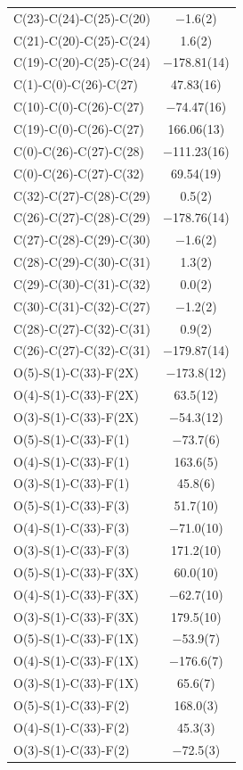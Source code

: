 \begin{center}
{\begin{supertabular}{p{1.5in}c}
C(23)-C(24)-C(25)-C(20)&$-$1.6(2)\\
C(21)-C(20)-C(25)-C(24)&1.6(2)\\
C(19)-C(20)-C(25)-C(24)&$-$178.81(14)\\
C(1)-C(0)-C(26)-C(27)&47.83(16)\\
C(10)-C(0)-C(26)-C(27)&$-$74.47(16)\\
C(19)-C(0)-C(26)-C(27)&166.06(13)\\
C(0)-C(26)-C(27)-C(28)&$-$111.23(16)\\
C(0)-C(26)-C(27)-C(32)&69.54(19)\\
C(32)-C(27)-C(28)-C(29)&0.5(2)\\
C(26)-C(27)-C(28)-C(29)&$-$178.76(14)\\
C(27)-C(28)-C(29)-C(30)&$-$1.6(2)\\
C(28)-C(29)-C(30)-C(31)&1.3(2)\\
C(29)-C(30)-C(31)-C(32)&0.0(2)\\
C(30)-C(31)-C(32)-C(27)&$-$1.2(2)\\
C(28)-C(27)-C(32)-C(31)&0.9(2)\\
C(26)-C(27)-C(32)-C(31)&$-$179.87(14)\\
O(5)-S(1)-C(33)-F(2X)&$-$173.8(12)\\
O(4)-S(1)-C(33)-F(2X)&63.5(12)\\
O(3)-S(1)-C(33)-F(2X)&$-$54.3(12)\\
O(5)-S(1)-C(33)-F(1)&$-$73.7(6)\\
O(4)-S(1)-C(33)-F(1)&163.6(5)\\
O(3)-S(1)-C(33)-F(1)&45.8(6)\\
O(5)-S(1)-C(33)-F(3)&51.7(10)\\
O(4)-S(1)-C(33)-F(3)&$-$71.0(10)\\
O(3)-S(1)-C(33)-F(3)&171.2(10)\\
O(5)-S(1)-C(33)-F(3X)&60.0(10)\\
O(4)-S(1)-C(33)-F(3X)&$-$62.7(10)\\
O(3)-S(1)-C(33)-F(3X)&179.5(10)\\
O(5)-S(1)-C(33)-F(1X)&$-$53.9(7)\\
O(4)-S(1)-C(33)-F(1X)&$-$176.6(7)\\
O(3)-S(1)-C(33)-F(1X)&65.6(7)\\
O(5)-S(1)-C(33)-F(2)&168.0(3)\\
O(4)-S(1)-C(33)-F(2)&45.3(3)\\
O(3)-S(1)-C(33)-F(2)&$-$72.5(3)\\
\end{supertabular}
}
\end{center}

